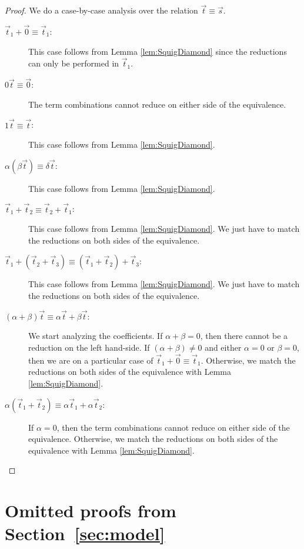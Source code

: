 \begin{proof}
  We do a case-by-case analysis over the relation $\vec{t}\equiv\vec{s}$.
  \begin{description}
    \item[$\vec{t}_{1} + \vec0\equiv\vec{t}_{1}$:] This case follows from Lemma \ref{lem:SquigDiamond} since the reductions can only be performed in $\vec{t}_{1}$.
    
    \item[$0\vec{t}\equiv\vec{0}$:] The term combinations cannot reduce on either side of the equivalence.
    
    \item[$1\vec{t}\equiv\vec{t}$:] This case follows from Lemma \ref{lem:SquigDiamond}.
    
    \item[$\alpha(\beta \vec{t})\equiv\delta\vec{t}$:] This case follows from Lemma \ref{lem:SquigDiamond}.
    
    \item[$\vec{t}_{1}+\vec{t}_{2}\equiv\vec{t}_{2}+\vec{t}_{1}$:] This case follows from Lemma \ref{lem:SquigDiamond}. We just have to match the reductions on both sides of the equivalence.
    
    \item[$\vec{t}_{1}+(\vec{t}_{2}+\vec{t}_{3})\equiv(\vec{t}_{1}+\vec{t}_{2})+\vec{t}_{3}$:] This case follows from Lemma \ref{lem:SquigDiamond}. We just have to match the reductions on both sides of the equivalence.
    
    \item[$(\alpha+\beta)\vec{t}\equiv\alpha\vec{t} + \beta\vec{t}$:] We start analyzing the coefficients. If $\alpha+\beta = 0$, then there cannot be a reduction on the left hand-side. If $(\alpha + \beta)\neq 0$ and either $\alpha=0$ or $\beta=0$, then we are on a particular case of $\vec{t}_{1} + \vec0\equiv\vec{t}_{1}$. Otherwise, we match the reductions on both sides of the equivalence with Lemma \ref{lem:SquigDiamond}.
    
    \item[$\alpha(\vec{t}_{1}+\vec{t}_{2})\equiv\alpha\vec{t}_{1}+\alpha\vec{t}_{2}$:] If $\alpha=0$, then the term combinations cannot reduce on either side of the equivalence. Otherwise, we match the reductions on both sides of the equivalence with Lemma \ref{lem:SquigDiamond}.    
    \qedhere
  \end{description}
\end{proof}


\section{Omitted proofs from Section~\ref{sec:model}}\label{sec:appendixC}


